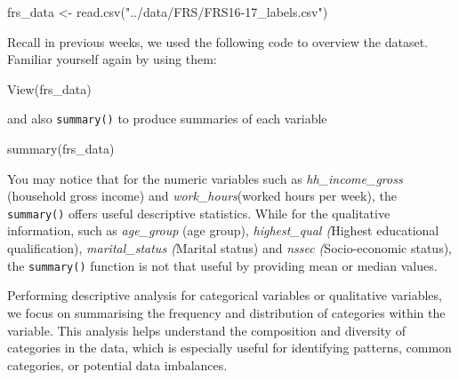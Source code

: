 \documentclass[
  letterpaper,
  DIV=11,
  numbers=noendperiod]{scrreprt}
\newenvironment{Shaded}{\begin{snugshade}}{\end{snugshade}}
\newcommand{\CommentTok}[1]{\textcolor[rgb]{0.37,0.37,0.37}{#1}}
\newcommand{\FunctionTok}[1]{\textcolor[rgb]{0.28,0.35,0.67}{#1}}
\newcommand{\NormalTok}[1]{\textcolor[rgb]{0.00,0.23,0.31}{#1}}
\newcommand{\OtherTok}[1]{\textcolor[rgb]{0.00,0.23,0.31}{#1}}
\newcommand{\SpecialCharTok}[1]{\textcolor[rgb]{0.37,0.37,0.37}{#1}}
\newcommand{\StringTok}[1]{\textcolor[rgb]{0.13,0.47,0.30}{#1}}
\begin{document}
\begin{Shaded}
\begin{Highlighting}[]
\NormalTok{frs\_data }\OtherTok{\textless{}{-}} \FunctionTok{read.csv}\NormalTok{(}\StringTok{"../data/FRS/FRS16{-}17\_labels.csv"}\NormalTok{)}
\end{Highlighting}
\end{Shaded}

Recall in previous weeks, we used the following code to overview the
dataset. Familiar yourself again by using them:

\begin{Shaded}
\begin{Highlighting}[]
\FunctionTok{View}\NormalTok{(frs\_data)}
\end{Highlighting}
\end{Shaded}

and also \texttt{summary()} to produce summaries of each variable

\begin{Shaded}
\begin{Highlighting}[]
\FunctionTok{summary}\NormalTok{(frs\_data)}
\end{Highlighting}
\end{Shaded}

You may notice that for the numeric variables such as
\emph{hh\_income\_gross} (household gross income) and
\emph{work\_hours}(worked hours per week), the \texttt{summary()} offers
useful descriptive statistics. While for the qualitative information,
such as \emph{age\_group} (age group), \emph{highest\_qual (}Highest
educational qualification), \emph{marital\_status (}Marital status) and
\emph{nssec (}Socio-economic status), the \texttt{summary()} function is
not that useful by providing mean or median values.

Performing descriptive analysis for categorical variables or qualitative
variables, we focus on summarising the frequency and distribution of
categories within the variable. This analysis helps understand the
composition and diversity of categories in the data, which is especially
useful for identifying patterns, common categories, or potential data
imbalances.

\begin{Shaded}
\end{Shaded}
\end{document}
